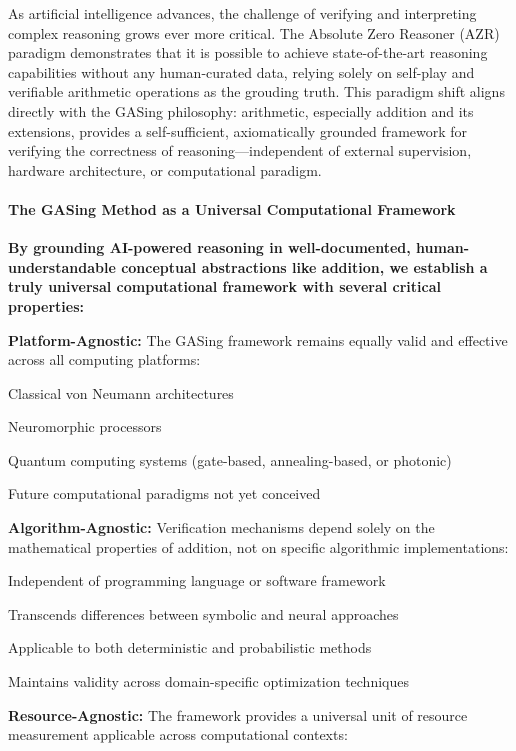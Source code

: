 As artificial intelligence advances, the challenge of verifying and interpreting complex reasoning grows ever more critical. The Absolute Zero Reasoner (AZR) paradigm demonstrates that it is possible to achieve state-of-the-art reasoning capabilities without any human-curated data, relying solely on self-play and verifiable arithmetic operations as the grouding truth. This paradigm shift aligns directly with the GASing philosophy: arithmetic, especially addition and its extensions, provides a self-sufficient, axiomatically grounded framework for verifying the correctness of reasoning—independent of external supervision, hardware architecture, or computational paradigm.
\paragraph{The GASing Method as a Universal Computational Framework}

\textbf{By grounding AI-powered reasoning in well-documented, human-understandable conceptual abstractions like addition, we establish a truly universal computational framework with several critical properties:}


\noindent\textbf{\textbf{Platform-Agnostic:} } The GASing framework remains equally valid and effective across all computing platforms:


\noindent Classical von Neumann architectures


\noindent Neuromorphic processors


\noindent Quantum computing systems (gate-based, annealing-based, or photonic)


\noindent Future computational paradigms not yet conceived



\noindent\textbf{\textbf{Algorithm-Agnostic:} } Verification mechanisms depend solely on the mathematical properties of addition, not on specific algorithmic implementations:


\noindent Independent of programming language or software framework


\noindent Transcends differences between symbolic and neural approaches


\noindent Applicable to both deterministic and probabilistic methods


\noindent Maintains validity across domain-specific optimization techniques



\noindent\textbf{\textbf{Resource-Agnostic:} } The framework provides a universal unit of resource measurement applicable across computational contexts:


